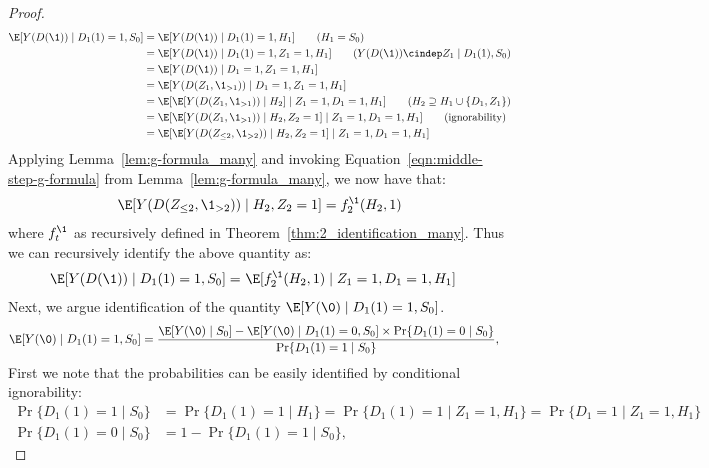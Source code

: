 \begin{proof}
\begin{align*}
\E[ Y(D(\1)) \mid D_1(1)=1, S_0 ]
&= 
\E[ Y(D(\1)) \mid D_1(1)=1, H_1 ] \tag{$H_1=S_0$}\\
&=
  \E[ Y(D(\1)) \mid D_1(1)=1, Z_1=1, H_1 ]  \tag{$Y(D(\1))\cindep Z_1\mid D_1(1), S_0$}\\
&=
  \E[ Y(D(\1)) \mid D_1=1, Z_1=1, H_1 ]     \\
&=
  \E[ Y(D(Z_1, \1_{>1})) \mid D_1=1, Z_1=1, H_1 ]     \\
&=
  \E[ \E[ Y(D(Z_1, \1_{>1})) \mid H_2 ] \mid Z_1=1, D_1=1, H_1  ] \tag{$H_2 \supseteq H_1 \cup \{D_1, Z_1\}$}\\
&=
  \E[ \E[ Y(D(Z_1, \1_{>1})) \mid H_2, Z_2=1 ] \mid Z_1=1, D_1=1, H_1]     \tag{ignorability}\\
&=
  \E[ \E[ Y(D(Z_{\leq 2}, \1_{>2})) \mid H_2, Z_2=1 ] \mid Z_1=1, D_1=1, H_1] 
\end{align*}
Applying Lemma~\ref{lem:g-formula_many} and invoking Equation~\eqref{eqn:middle-step-g-formula} from Lemma~\ref{lem:g-formula_many}, we now have that:
\begin{align*}
    \E[ Y(D(Z_{\leq 2}, \1_{>2})) \mid H_2, Z_2=1 ] = f_2^{\1}(H_2, 1)
\end{align*}
where $f_t^{\1}$ as recursively defined in Theorem~\ref{thm:2_identification_many}. Thus we can recursively identify the above quantity as:
\begin{equation}
\begin{aligned}
\E[ Y(D(\1)) \mid D_1(1)=1, S_0 ] =~& \E[ f_2^{\1}(H_2, 1)\mid Z_1=1, D_1=1, H_1]
\end{aligned}
\end{equation}
Next, we argue identification of the quantity $\E[Y(\0)\mid D_1(1)=1, S_0]$.
\begin{align*}
\E[ Y(\0) \mid D_1(1)=1, S_0 ]
&=\frac{
    \E[ Y(\0) \mid S_0 ]
    - \E[ Y(\0) \mid D_1(1)=0, S_0 ] \times \Pr\{ D_1(1)=0 \mid S_0 \}
  }{ \Pr\{ D_1(1)=1 \mid S_0 \} }, 
\end{align*}
First we note that the probabilities can be easily identified by conditional ignorability:
\begin{align}\label{eqn:d1-1}
\Pr\{ D_1(1)=1 \mid S_0 \} &= \Pr\{ D_1(1)=1 \mid H_1 \}
=\Pr\{ D_1(1)=1 \mid Z_1=1, H_1 \}  
=\Pr\{ D_1=1 \mid Z_1=1, H_1 \}     \\
\Pr\{ D_1(1)=0 \mid S_0 \}
&=1 - \Pr\{ D_1(1)=1 \mid S_0 \}, 
\end{align}


\end{proof}
